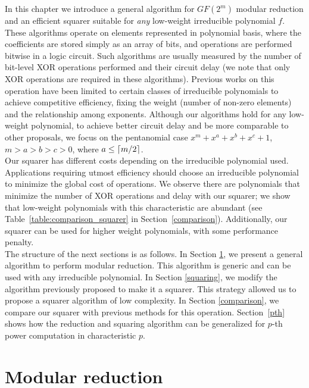 In this chapter we introduce a general algorithm for $GF(2^m)$ modular reduction and an efficient squarer suitable for \emph{any} low-weight irreducible polynomial $f$. These algorithms operate on elements represented in polynomial basis, where the coefficients are stored simply as an array of bits, and operations are performed bitwise in a logic circuit. Such algorithms are usually measured by the number of bit-level XOR operations performed and their circuit delay (we note that only XOR operations are required in these algorithms). Previous works on this operation have been limited to certain classes of irreducible polynomials to achieve competitive efficiency, fixing the weight (number of non-zero elements) and the relationship among exponents. 
Although our algorithms hold for any low-weight polynomial, to achieve better circuit delay and be more comparable to other proposals, we focus on the pentanomial case $x^m+x^a+x^b+x^c+1$, $m > a > b > c > 0$, where $a \leq \lceil m/2\rceil$.\\

Our squarer has different costs depending on the irreducible polynomial used. Applications requiring utmost efficiency should choose an irreducible polynomial to minimize the global cost of operations. We observe there are polynomials that minimize the number of XOR operations and delay with our squarer; we show that low-weight polynomials with this characteristic are abundant (see Table~\ref{table:comparison_squarer} in Section~\ref{comparison}). Additionally, our squarer can be used for higher weight polynomials, with some performance penalty.\\

The structure of the next sections is as follows. In Section \ref{modrec}, we present a general algorithm to perform modular reduction. This algorithm is generic and can be used with any irreducible polynomial. In Section \ref{squaring}, we modify the algorithm previously proposed to make it a squarer. This strategy allowed us to propose a squarer algorithm of low complexity. In Section \ref{comparison}, we compare our squarer with previous methods for this operation. Section~\ref{pth} shows how the reduction and squaring algorithm can be generalized for $p$-th power computation in characteristic $p$. \\

\section{Modular reduction} \label{modrec}


